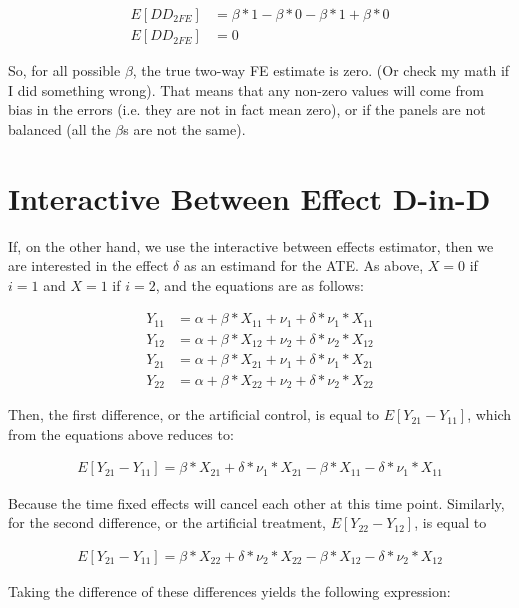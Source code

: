 \documentclass{article}
\begin{document}
	\begin{align*}
	E[DD_{2FE}] &= \beta * 1 - \beta * 0 - \beta * 1 + \beta * 0 \\
	E[DD_{2FE}] &= 0
\end{align*}

So, for all possible $\beta$, the true two-way FE estimate is zero. (Or check my math if I did something wrong). That means that any non-zero values will come from bias in the errors (i.e. they are not in fact mean zero), or if the panels are not balanced (all the $\beta$s are not the same).

\section*{Interactive Between Effect D-in-D}

If, on the other hand, we use the interactive between effects estimator, then we are interested in the effect $\delta$ as an estimand for the ATE. As above, $X=0$ if $i=1$ and $X=1$ if $i=2$, and the equations are as follows:

\begin{align*}
Y_{11} &= \alpha + \beta * X_{11} + \nu_1 + \delta * \nu_1 * X_{11} \\
Y_{12} &= \alpha + \beta * X_{12} + \nu_2 + \delta * \nu_2 * X_{12}\\
Y_{21} &= \alpha + \beta * X_{21} + \nu_1 + \delta * \nu_1 * X_{21}\\
Y_{22} &= \alpha + \beta * X_{22} + \nu_2 + \delta * \nu_2 * X_{22}
\end{align*}

Then, the first difference, or the artificial control, is equal to $E[Y_{21} - Y_{11}]$, which from the equations above reduces to:

\begin{align*}
E[Y_{21} - Y_{11}] = \beta * X_{21} + \delta * \nu_1 * X_{21} - \beta * X_{11} - \delta * \nu_1 * X_{11}
\end{align*}

Because the time fixed effects will cancel each other at this time point. Similarly, for the second difference, or the artificial treatment, $E[Y_{22} - Y_{12}]$, is equal to 

\begin{align*}
E[Y_{21} - Y_{11}] = \beta * X_{22} + \delta * \nu_2 * X_{22} - \beta * X_{12} - \delta * \nu_2 * X_{12} 
\end{align*}

Taking the difference of these differences yields the following expression:
\end{document}
